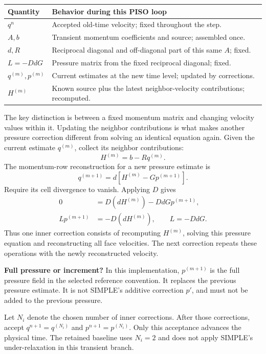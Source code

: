 \begin{center}\begin{tabular}{lp{.72\linewidth}}\toprule
Quantity & Behavior during this PISO loop\\\midrule
$q^n$ & Accepted old-time velocity; fixed throughout the step.\\
$A,b$ & Transient momentum coefficients and source; assembled once.\\
$d,R$ & Reciprocal diagonal and off-diagonal part of this same $A$; fixed.\\
$L=-DdG$ & Pressure matrix from the fixed reciprocal diagonal; fixed.\\
$q^{(m)},p^{(m)}$ & Current estimates at the new time level; updated by corrections.\\
$H^{(m)}$ & Known source plus the latest neighbor-velocity contributions; recomputed.\\\bottomrule
\end{tabular}\end{center}
The key distinction is between a fixed momentum matrix and changing velocity
values within it. Updating the neighbor contributions is what makes another
pressure correction different from solving an identical equation again.
\newpage
{}
Given the current estimate $q^{(m)}$, collect its neighbor contributions:
\[
H^{(m)}=b-Rq^{(m)}.
\]
The momentum-row reconstruction for a new pressure estimate is
\[
q^{(m+1)}=d[H^{(m)}-Gp^{(m+1)}].
\]
Require its cell divergence to vanish. Applying $D$ gives
\begin{align*}
0&=D(dH^{(m)})-DdG p^{(m+1)},\\
Lp^{(m+1)}&=-D(dH^{(m)}),\qquad L=-DdG.
\end{align*}
Thus one inner correction consists of recomputing $H^{(m)}$, solving this
pressure equation and reconstructing all face velocities. The next
correction repeats these operations with the newly reconstructed velocity.

\textbf{Full pressure or increment?} In this implementation,
$p^{(m+1)}$ is the full pressure field in the selected reference convention.
It replaces the previous pressure estimate. It is not SIMPLE's additive
correction $p'$, and must not be added to the previous pressure.

Let $N_i$ denote the chosen number of inner corrections. After those
corrections, accept $q^{n+1}=q^{(N_i)}$ and $p^{n+1}=p^{(N_i)}$.
Only this acceptance advances the physical time. The retained baseline uses
$N_i=2$ and does not apply SIMPLE's under-relaxation in this transient branch.

